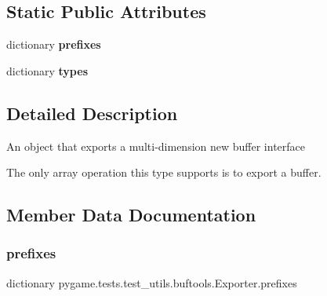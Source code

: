 \subsection*{Static Public Attributes}
\begin{DoxyCompactItemize}
\item 
dictionary {\bfseries prefixes}
\item 
dictionary {\bfseries types}
\end{DoxyCompactItemize}


\subsection{Detailed Description}
\begin{DoxyVerb}An object that exports a multi-dimension new buffer interface

   The only array operation this type supports is to export a buffer.
\end{DoxyVerb}
 

\subsection{Member Data Documentation}
\mbox{\label{classpygame_1_1tests_1_1test__utils_1_1buftools_1_1_exporter_a23b868f5e0c7f357a1df7d5cbbedeb5e}} 
\subsubsection{\texorpdfstring{prefixes}{prefixes}}
{\footnotesize\ttfamily dictionary pygame.\+tests.\+test\+\_\+utils.\+buftools.\+Exporter.\+prefixes\hspace{0.3cm}{\ttfamily [static]}}

